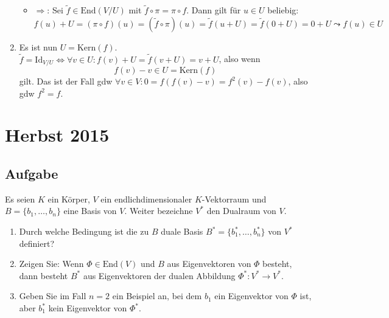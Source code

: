 \begin{enumerate}
\begin{itemize}
	 	\item \( \Rightarrow \): Sei \( \widetilde{f} \in \text{End}(V/U) \) mit \( \widetilde{f} \circ \pi = \pi \circ f \). Dann gilt für \( u \in U \) beliebig:
	 	\begin{equation*}
	 		f(u) + U = (\pi \circ f)(u) = (\widetilde{f} \circ \pi)(u) = \widetilde{f}(u+U) = \widetilde{f}(0+U) = 0+U \leadsto f(u) \in U
	 	\end{equation*}
	 \end{itemize} 

	 \item Es ist nun \( U = \text{Kern}(f) \). \( \widetilde{f} = \text{Id}_{V/U} \Leftrightarrow \forall v \in U : f(v) + U = \widetilde{f}(v+U)=v+U \), also wenn
	 \begin{equation*}
	 	f(v)-v \in U = \text{Kern}(f)
	 \end{equation*}
	 gilt. Das ist der Fall gdw \( \forall v \in V: 0 = f(f(v) - v) = f^2(v)-f(v) \), also gdw \( f^2=f \).
\end{enumerate}

\newpage


\section{Herbst 2015}

\subsection{Aufgabe}
Es seien \( K \) ein Körper, \( V \) ein endlichdimensionaler \( K \)-Vektorraum und \( B = \{ b_1, \dots, b_n \} \) eine Basis von \( V \). Weiter bezeichne \( V^\ast \) den Dualraum von \( V \).
\begin{enumerate}
	\item Durch welche Bedingung ist die zu \( B \) duale Basis \( B^\ast = \{ b_1^\ast, \dots, b_n^\ast \} \) von \( V^\ast \) definiert?
	\item Zeigen Sie: Wenn \( \Phi \in \text{End}(V) \) und \( B \) aus Eigenvektoren von \( \Phi \) besteht, dann besteht \( B^\ast \) aus Eigenvektoren der dualen Abbildung \( \Phi^\ast: V^\ast \to V^\ast \).
	\item Geben Sie im Fall \( n = 2 \) ein Beispiel an, bei dem \( b_1 \) ein Eigenvektor von \( \Phi \) ist, aber \( b_1^\ast \) kein Eigenvektor von \( \Phi^\ast \). 
\end{enumerate}

